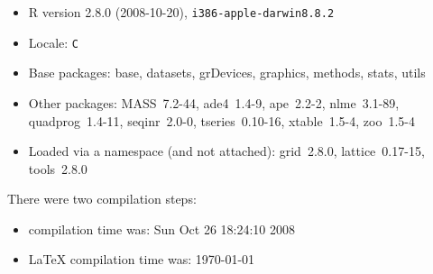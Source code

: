 \documentclass{article}
\begin{document}
\begin{itemize}
  \item R version 2.8.0 (2008-10-20), \verb|i386-apple-darwin8.8.2|
  \item Locale: \verb|C|
  \item Base packages: base, datasets, grDevices, graphics, methods,
    stats, utils
  \item Other packages: MASS~7.2-44, ade4~1.4-9, ape~2.2-2,
    nlme~3.1-89, quadprog~1.4-11, seqinr~2.0-0, tseries~0.10-16,
    xtable~1.5-4, zoo~1.5-4
  \item Loaded via a namespace (and not attached): grid~2.8.0,
    lattice~0.17-15, tools~2.8.0
\end{itemize}
There were two compilation steps:

\begin{itemize}
  \item \Rlogo{} compilation time was: Sun Oct 26 18:24:10 2008
  \item \LaTeX{} compilation time was: \today
\end{itemize}



\clearpage
{}


\end{document}
